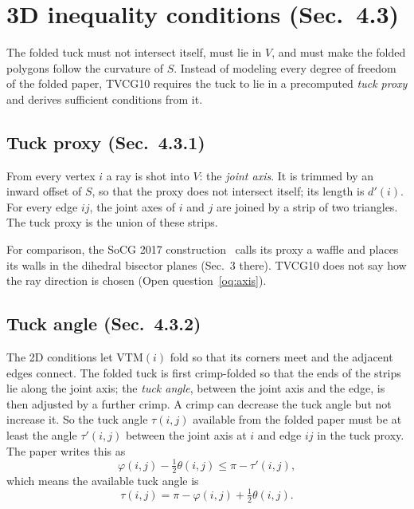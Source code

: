 \documentclass[11pt]{article}
\theoremstyle{definition}
\newcommand{\VTM}{\mathrm{VTM}}
\begin{document}
\section{3D inequality conditions (Sec.~4.3)}

The folded tuck must not intersect itself, must lie in $V$, and must make the
folded polygons follow the curvature of $S$. Instead of modeling every degree of
freedom of the folded paper, TVCG10 requires the tuck to lie in a precomputed
\emph{tuck proxy} and derives sufficient conditions from it.

\subsection{Tuck proxy (Sec.~4.3.1)}

From every vertex $i$ a ray is shot into $V$: the \emph{joint axis}. It is
trimmed by an inward offset of $S$, so that the proxy does not intersect itself;
its length is $d'(i)$. For every edge $ij$, the joint axes of $i$ and $j$ are
joined by a strip of two triangles. The tuck proxy is the union of these strips.

For comparison, the SoCG 2017 construction~\cite{socg17} calls its proxy a
waffle and places its walls in the dihedral bisector planes (Sec.~3 there).
TVCG10 does not say how the ray direction is chosen
(Open question~\ref{oq:axis}).

\subsection{Tuck angle (Sec.~4.3.2)}

The 2D conditions let $\VTM(i)$ fold so that its corners meet and the adjacent
edges connect. The folded tuck is first crimp-folded so that the ends of the
strips lie along the joint axis; the \emph{tuck angle}, between the joint axis
and the edge, is then adjusted by a further crimp. A crimp can decrease the tuck
angle but not increase it. So the tuck angle $\tau(i,j)$ available from the
folded paper must be at least the angle $\tau'(i,j)$ between the joint axis at
$i$ and edge $ij$ in the tuck proxy. The paper writes this as
\begin{equation}
  \varphi(i,j) - \tfrac12\theta(i,j) \le \pi - \tau'(i,j),
  \tag{T10}\label{T10}
\end{equation}
which means the available tuck angle is
\begin{equation}
  \tau(i,j) = \pi - \varphi(i,j) + \tfrac12\theta(i,j).
  \label{eq:tau}
\end{equation}
\end{document}
